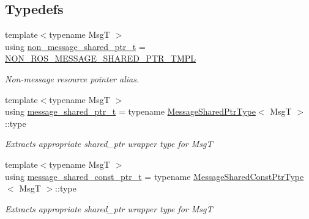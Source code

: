 \subsection*{Typedefs}
\begin{DoxyCompactItemize}
\item 
\mbox{\label{namespaceflow__ros_aa27be896eb2c4c34fef0e9b7dd444d4c}} 
{\footnotesize template$<$typename MsgT $>$ }\\using \hyperlink{namespaceflow__ros_aa27be896eb2c4c34fef0e9b7dd444d4c}{non\+\_\+message\+\_\+shared\+\_\+ptr\+\_\+t} = \hyperlink{message__ptr_8h_a17fb2c81a1959d50ef0f0e0a31fcb667}{N\+O\+N\+\_\+\+R\+O\+S\+\_\+\+M\+E\+S\+S\+A\+G\+E\+\_\+\+S\+H\+A\+R\+E\+D\+\_\+\+P\+T\+R\+\_\+\+T\+M\+PL}
\begin{DoxyCompactList}\small\item\em Non-\/message resource pointer alias. \end{DoxyCompactList}\item 
\mbox{\label{namespaceflow__ros_a21a684f38ee2083b3858613317c46d82}} 
{\footnotesize template$<$typename MsgT $>$ }\\using \hyperlink{namespaceflow__ros_a21a684f38ee2083b3858613317c46d82}{message\+\_\+shared\+\_\+ptr\+\_\+t} = typename \hyperlink{structflow__ros_1_1_message_shared_ptr_type}{Message\+Shared\+Ptr\+Type}$<$ MsgT $>$\+::type
\begin{DoxyCompactList}\small\item\em Extracts appropriate shared\+\_\+ptr wrapper type for {\ttfamily MsgT} \end{DoxyCompactList}\item 
\mbox{\label{namespaceflow__ros_ad222b6c2bd0341c551129c3a03241ad7}} 
{\footnotesize template$<$typename MsgT $>$ }\\using \hyperlink{namespaceflow__ros_ad222b6c2bd0341c551129c3a03241ad7}{message\+\_\+shared\+\_\+const\+\_\+ptr\+\_\+t} = typename \hyperlink{structflow__ros_1_1_message_shared_const_ptr_type}{Message\+Shared\+Const\+Ptr\+Type}$<$ MsgT $>$\+::type
\begin{DoxyCompactList}\small\item\em Extracts appropriate shared\+\_\+ptr wrapper type for {\ttfamily MsgT} \end{DoxyCompactList}\end{DoxyCompactItemize}
